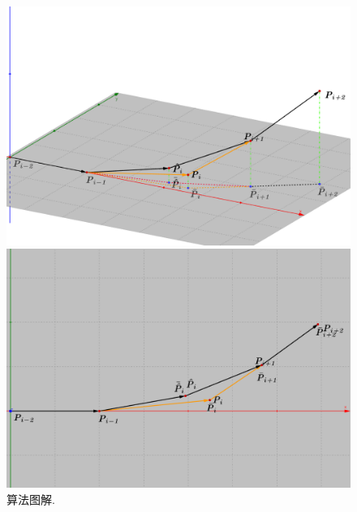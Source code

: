 \documentclass[utf8]{ctexart} %
\numberwithin{figure}{section}
\numberwithin{equation}{section}
\begin{document}
	 \begin{figure}[ht]
	 	\centering
	 
	 	\begin{minipage}[b]{0.45\textwidth} %
	 		\centering
	 		\includegraphics[width=\textwidth]{figures/al_main_bold.png}
	 	\end{minipage}\hfill
	 	\begin{minipage}[b]{0.45\textwidth} %
	 		\centering
	 		\includegraphics[width=\textwidth]{figures/al_top_bold.png}
	 	\end{minipage}
	 	\caption{算法图解. }
	 	\label{algorithm_explain}
	 \end{figure}
	 
\end{document}

